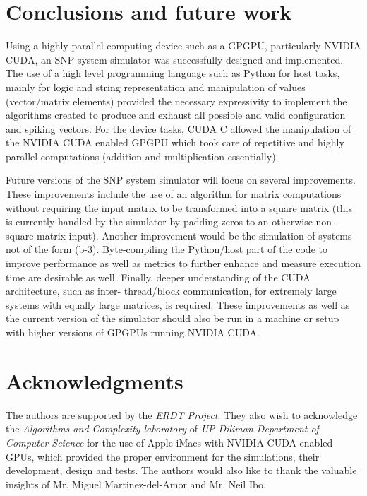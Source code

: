 \documentclass{acm_proc_article-sp}
\begin{document}
\section{Conclusions and future work}
Using a highly parallel computing device such as a GPGPU,
particularly NVIDIA CUDA, an SNP system simulator was
successfully designed and implemented. The use of a high
level programming language such as Python for host tasks,
mainly for logic and string representation and manipulation
of values (vector/matrix elements) provided the necessary
expressivity to implement the algorithms created to produce
and exhaust all possible and valid configuration and spiking
vectors. For the device tasks, CUDA C allowed the
manipulation of the NVIDIA CUDA enabled GPGPU which
took care of repetitive and highly parallel computations
(addition and multiplication essentially).

Future versions of the SNP system simulator will focus on
several improvements. These improvements include the use
of an algorithm for matrix computations without requiring
the input matrix to be transformed into a square matrix (this is
currently handled by the simulator by padding zeros to an
otherwise non-square matrix input). Another improvement
would be the simulation of systems not of the form (b-3).
Byte-compiling the Python/host part of the code to improve
performance as well as metrics to further enhance and
measure execution time are desirable as well. Finally, deeper
understanding of the CUDA architecture, such as inter-
thread/block communication, for extremely large systems
with equally large matrices, is required. These
improvements as well as the current version of the simulator
should also be run in a machine or setup with higher versions of
GPGPUs running NVIDIA CUDA.


\section{ Acknowledgments }
The authors are supported by the \textit{ERDT Project}. They also wish to acknowledge the \textit{Algorithms and Complexity laboratory} of \textit{UP Diliman Department of Computer Science} for the use of Apple iMacs with NVIDIA CUDA enabled GPUs, which provided the proper environment for the simulations, their development, design and tests. The authors would also like to thank the valuable insights of Mr. Miguel Martinez-del-Amor and Mr. Neil Ibo.
\end{document}
